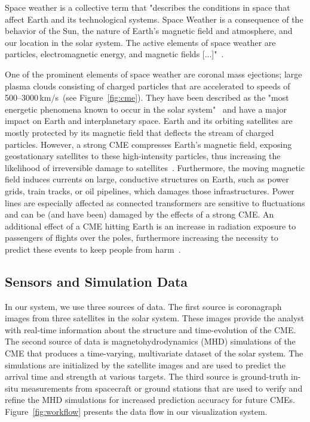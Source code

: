 \documentclass[journal]{vgtc}                %
\begin{document}
Space weather is a collective term that "describes the conditions in space that affect Earth and its technological systems. Space Weather is a consequence of the behavior of the Sun, the nature of Earth’s magnetic field and atmosphere, and our location in the solar system. The active elements of space weather are particles, electromagnetic energy, and magnetic fields [...]"~\cite{noaaprofile}.

One of the prominent elements of space weather are coronal mass ejections; large plasma clouds consisting of charged particles that are accelerated to speeds of 500--3000\,km/s~(see Figure~\ref{fig:cme}). They have been described as the "most energetic phenomena known to occur in the solar system"~\cite{Kahler:1987jt} and have a major impact on Earth and interplanetary space. Earth and its orbiting satellites are mostly protected by its magnetic field that deflects the stream of charged particles. However, a strong CME compresses Earth's magnetic field, exposing geostationary satellites to these high-intensity particles, thus increasing the likelihood of irreversible damage to satellites~\cite{Guhathakurta:2013cl}. Furthermore, the moving magnetic field induces currents on large, conductive structures on Earth, such as power grids, train tracks, or oil pipelines, which damages those infrastructures. Power lines are especially affected as connected transformers are sensitive to fluctuations and can be (and have been) damaged by the effects of a strong CME. An additional effect of a CME hitting Earth is an increase in radiation exposure to passengers of flights over the poles, furthermore increasing the necessity to predict these events to keep people from harm~\cite{Matthia:2009en}.

\subsection{Sensors and Simulation Data} \label{sec:data}
In our system, we use three sources of data. The first source is coronagraph images from three satellites in the solar system. These images provide the analyst with real-time information about the structure and time-evolution of the CME. The second source of data is magnetohydrodynamics (MHD) simulations of the CME that produces a time-varying, multivariate dataset of the solar system. The simulations are initialized by the satellite images and are used to predict the arrival time and strength at various targets. The third source is ground-truth in-situ measurements from spacecraft or ground stations that are used to verify and refine the MHD simulations for increased prediction accuracy for future CMEs. Figure~\ref{fig:workflow} presents the data flow in our visualization system.
\end{document}
